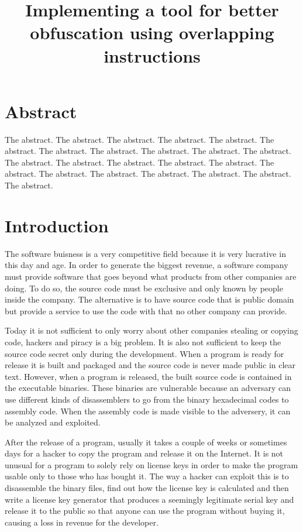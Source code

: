 \documentclass[11pt,twoside]{eitExjobb}
\title{Implementing a tool for better obfuscation using overlapping instructions}
\begin{document}
\Date{\today}
\MakeTitlePage
\frontmatter
\chapter*{Abstract}
The abstract. The abstract. The abstract. The abstract. The
abstract. The abstract. The abstract. The abstract. The abstract. The
abstract. The abstract. The abstract. The abstract. The abstract. The
abstract. The abstract. The abstract. The abstract. The abstract. The
abstract. The abstract. The abstract. The abstract.

\tableofcontents
\listoftables
\cleardoublepage
\mainmatter

\chapter{Introduction}
The software buisness is a very competitive field because it is very lucrative in this day and age. In order to generate the biggest revenue, a software company must provide software that goes beyond what products from other companies are doing. To do so, the source code must be exclusive and only known by people inside the company. The alternative is to have source code that is public domain but provide a service to use the code with that no other company can provide. 

Today it is not sufficient to only worry about other companies stealing or copying code, hackers and piracy is a big problem. It is also not sufficient to keep the source code secret only during the development. When a program is ready for release it is built and packaged and the source code is never made public in clear text. However, when a program is released, the built source code is contained in the executable binaries. These binaries are vulnerable because an adversary can use different kinds of disassemblers to go from the binary hexadecimal codes to assembly code. When the assembly code is made visible to the adversery, it can be analyzed and exploited. 

After the release of a program, usually it takes a couple of weeks or sometimes days for a hacker to copy the program and release it on the Internet. It is not unusual for a program to solely rely on license keys in order to make the program usable only to those who has bought it. The way a hacker can exploit this is to disassemble the binary files, find out how the license key is calculated and then write a license key generator that produces a seemingly legitimate serial key and release it to the public so that anyone can use the program without buying it, causing a loss in revenue for the developer.
\end{document}
